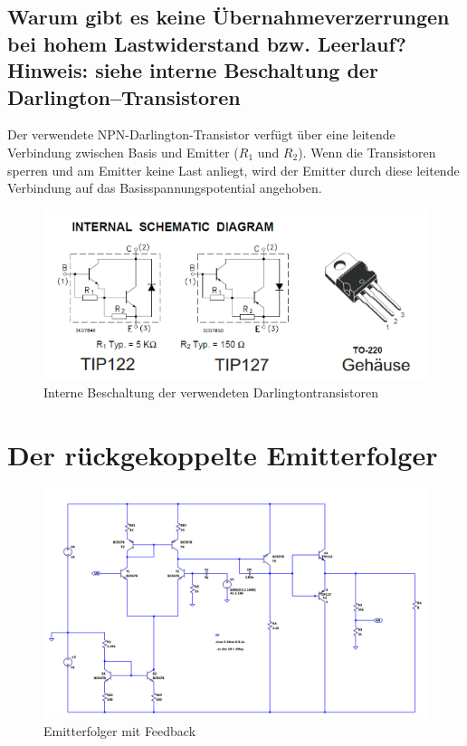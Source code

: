 \subsection{Warum gibt es keine Übernahmeverzerrungen bei hohem Lastwiderstand bzw. Leerlauf?Hinweis: siehe interne Beschaltung der Darlington–Transistoren}

Der verwendete NPN-Darlington-Transistor verfügt über eine leitende Verbindung zwischen Basis und Emitter ($R_1$ und $R_2$). Wenn die Transistoren sperren und am Emitter keine Last anliegt, wird der Emitter durch diese leitende Verbindung auf das Basisspannungspotential angehoben.

\begin{figure}[H]
    \centering
    \includegraphics{tex/7_Leistungsverstaerker/pictures/Darlington.png}
    \caption{Interne Beschaltung der verwendeten Darlingtontransistoren}
\end{figure}

\section{Der rückgekoppelte Emitterfolger}

\begin{figure}[H]
    \centering
    \includegraphics[width = \textwidth]{tex/7_Leistungsverstaerker/pictures/feedback_schem.png}
    \caption{Emitterfolger mit Feedback}
\end{figure}

